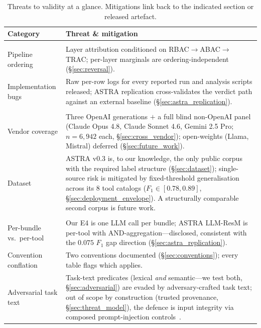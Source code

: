 \documentclass[sigconf,review,anonymous]{acmart}
\begin{document}
\begin{table}[!t]
\centering
\caption{Threats to validity at a glance. Mitigations link back to the indicated section or released artefact.}
\label{tab:threats}
\scriptsize
\setlength{\tabcolsep}{3pt}
\begin{tabularx}{\columnwidth}{@{}>{\raggedright\arraybackslash}p{1.8cm}>{\raggedright\arraybackslash}X@{}}
\toprule
\textbf{Category} & \textbf{Threat \& mitigation} \\
\midrule
\multicolumn{2}{@{}l}{\textit{Internal}} \\
Pipeline ordering & Layer attribution conditioned on RBAC$\to$ABAC$\to$TRAC; per-layer marginals are ordering-independent (\S\ref{sec:reversal}). \\
Implementation bugs & Raw per-row logs for every reported run and analysis scripts released; ASTRA replication cross-validates the verdict path against an external baseline (\S\ref{sec:astra_replication}). \\
\midrule
\multicolumn{2}{@{}l}{\textit{External}} \\
Vendor coverage & Three OpenAI generations $+$ a full blind non-OpenAI panel (Claude Opus 4.8, Claude Sonnet 4.6, Gemini 2.5 Pro; $n\!=\!6{,}942$ each, \S\ref{sec:cross_vendor}); open-weights (Llama, Mistral) deferred (\S\ref{sec:future_work}). \\
Dataset & ASTRA v0.3 is, to our knowledge, the only public corpus with the required label structure (\S\ref{sec:dataset}); single-source risk is mitigated by fixed-threshold generalisation across its $8$ tool catalogs ($F_1\!\in\![0.78,0.89]$, \S\ref{sec:deployment_envelope}). A structurally comparable second corpus is future work. \\
\midrule
\multicolumn{2}{@{}l}{\textit{Construct}} \\
Per-bundle vs.\ per-tool & Our E4 is one LLM call per bundle; ASTRA LLM-ResM is per-tool with AND-aggregation---disclosed, consistent with the $0.075$ $F_1$ gap direction (\S\ref{sec:astra_replication}). \\
Convention conflation & Two conventions documented (\S\ref{sec:conventions}); every table flags which applies. \\
Adversarial task text & Task-text predicates (lexical \emph{and} semantic---we test both, \S\ref{sec:adversarial}) are evaded by adversary-crafted task text; out of scope by construction (trusted provenance, \S\ref{sec:threat_model}), the defence is input integrity via composed prompt-injection controls~\cite{liu2024formalizing}. \\

\end{tabularx}
\end{table}
\end{document}
